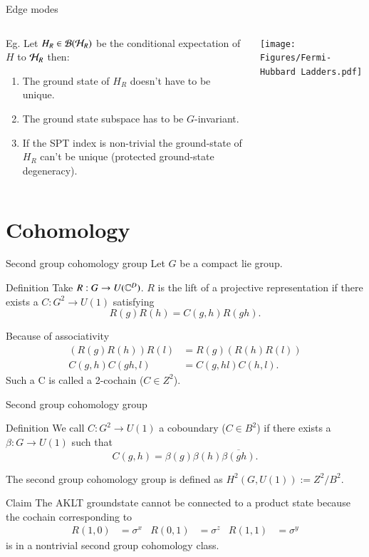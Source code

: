 \documentclass{beamer}
\begin{document}
\begin{frame}{Edge modes}
	\begin{columns}
		\begin{column}{0.6\textwidth}
			Eg. Let $H_R\in\mathcal{B}(\mathcal{H}_R)$ be the conditional expectation of $H$ to $\mathcal{H}_R$ then:
			\pause
			\begin{enumerate}
				\item The ground state of $H_R$ doesn't have to be unique.
				\item The ground state subspace has to be $G$-invariant.
				\item If the SPT index is non-trivial the ground-state of $H_R$ can't be unique (protected ground-state degeneracy).
			\end{enumerate}
		\end{column}
		\begin{column}{0.4\textwidth}  %
			\begin{center}
				\texttt{[image: Figures/Fermi-Hubbard Ladders.pdf]}
			\end{center}
		\end{column}
	\end{columns}
\end{frame}

\section{Cohomology}

\begin{frame}{Second group cohomology group}
	Let $G$ be a compact lie group.
	\begin{block}{Definition}
		Take $R:G\rightarrow U(\mathbb{C}^D)$. $R$ is the lift of a projective representation if there exists a $C:G^2\rightarrow U(1)$ satisfying
		\[R(g)R(h)=C(g,h)R(gh).\]
	\end{block}
	\pause
	Because of associativity
	\begin{align*}
		(R(g)R(h))R(l)&=R(g)(R(h)R(l))\\
		C(g,h)C(gh,l)&=C(g,hl)C(h,l).
	\end{align*}
	Such a C is called a 2-cochain ($C\in Z^2$).
\end{frame}

\begin{frame}{Second group cohomology group}
	\begin{block}{Definition}
		We call $C:G^2\rightarrow U(1)$ a coboundary ($C\in B^2$) if there exists a $\beta:G\rightarrow U(1)$ such that
		\[C(g,h)=\beta(g)\beta(h)\overline{\beta(gh)}.\]
	\end{block}
	The second group cohomology group is defined as $H^2(G,U(1)):=Z^2/B^2$.
	\pause
	\begin{block}{Claim}
		The AKLT groundstate cannot be connected to a product state because the cochain corresponding to
		\begin{align*}
			R(1,0)&=\sigma^x&R(0,1)&=\sigma^z&R(1,1)&=\sigma^y
		\end{align*}
		is in a nontrivial second group cohomology class.
	\end{block}
\end{frame}
\end{document}
